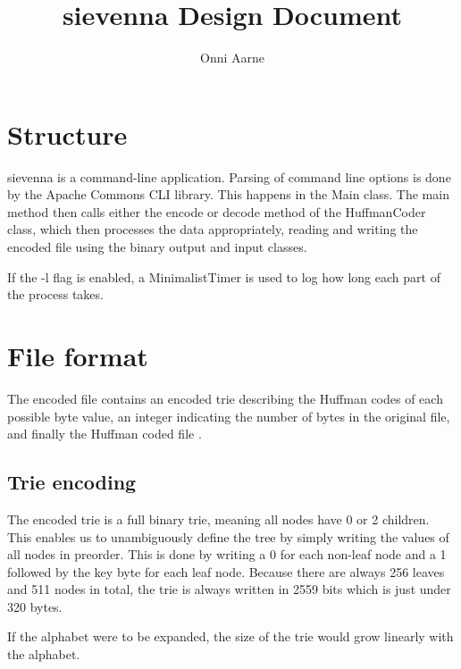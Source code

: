 \documentclass[11pt,a4paper,oneside,notitlepage,final]{article}
\begin{document}
	
	\setlength{\abovedisplayskip}{8.0pt plus3.0pt minus4.0pt}
	\setlength{\abovedisplayshortskip}{0.0pt plus3.0pt}
	\setlength{\belowdisplayskip}{8.0pt plus3.0pt minus4.0pt}
	\setlength{\belowdisplayshortskip}{7.0pt plus3.0pt minus3.0pt}
	
	\title{sievenna Design Document}
	\author{Onni Aarne}
	\maketitle
	
	\section{Structure}
	
	sievenna is a command-line application. Parsing of command line options is done by the Apache Commons CLI library. This happens in the Main class. The main method then calls either the encode or decode method of the HuffmanCoder class, which then processes the data appropriately, reading and writing the encoded file using the binary output and input classes.
	
	If the -l flag is enabled, a MinimalistTimer is used to log how long each part of the process takes.
	
	\section{File format}
	
	The encoded file contains an encoded trie describing the Huffman codes of each possible byte value, an integer indicating the number of bytes in the original file, and finally the Huffman coded file \cite{sedgewick2011algorithms}.
	
	\subsection{Trie encoding}
	The encoded trie is a full binary trie, meaning all nodes have 0 or 2 children. This enables us to unambiguously define the tree by simply writing the values of all nodes in preorder. This is done by writing a 0 for each non-leaf node and a 1 followed by the key byte for each leaf node. Because there are always 256 leaves and 511 nodes in total, the trie is always written in 2559 bits which is just under 320 bytes.
	
	If the alphabet were to be expanded, the size of the trie would grow linearly with the alphabet.
	
\end{document}
